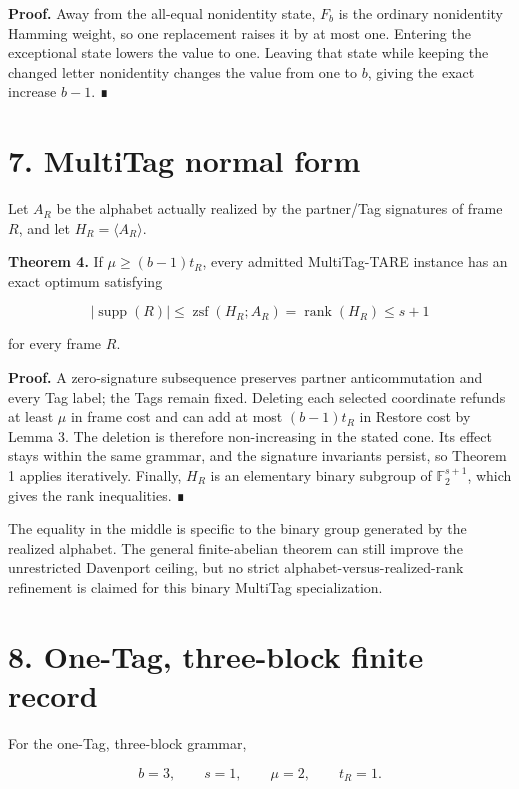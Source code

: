 \documentclass[
  11pt,
]{article}
\begin{document}
\textbf{Proof.} Away from the all-equal nonidentity state, \(F_b\) is
the ordinary nonidentity Hamming weight, so one replacement raises it by
at most one. Entering the exceptional state lowers the value to one.
Leaving that state while keeping the changed letter nonidentity changes
the value from one to \(b\), giving the exact increase \(b-1\). ∎

\hypertarget{multitag-normal-form}{%
\section{7. MultiTag normal form}\label{multitag-normal-form}}

Let \(A_R\) be the alphabet actually realized by the partner/Tag
signatures of frame \(R\), and let \(H_R=\langle A_R\rangle\).

\textbf{Theorem 4.} If \(\mu\ge(b-1)t_R\), every admitted MultiTag-TARE
instance has an exact optimum satisfying

\[
|\operatorname{supp}(R)|
\le \operatorname{zsf}(H_R; A_R)
= \operatorname{rank}(H_R)
\le s+1
\]

for every frame \(R\).

\textbf{Proof.} A zero-signature subsequence preserves partner
anticommutation and every Tag label; the Tags remain fixed. Deleting
each selected coordinate refunds at least \(\mu\) in frame cost and can
add at most \((b-1)t_R\) in Restore cost by Lemma 3. The deletion is
therefore non-increasing in the stated cone. Its effect stays within the
same grammar, and the signature invariants persist, so Theorem 1 applies
iteratively. Finally, \(H_R\) is an elementary binary subgroup of
\(\mathbb F_2^{s+1}\), which gives the rank inequalities. ∎

The equality in the middle is specific to the binary group generated by
the realized alphabet. The general finite-abelian theorem can still
improve the unrestricted Davenport ceiling, but no strict
alphabet-versus-realized-rank refinement is claimed for this binary
MultiTag specialization.

\hypertarget{one-tag-three-block-finite-record}{%
\section{8. One-Tag, three-block finite
record}\label{one-tag-three-block-finite-record}}

For the one-Tag, three-block grammar,

\[
b=3, \qquad s=1, \qquad \mu=2, \qquad t_R=1.
\]
\end{document}
